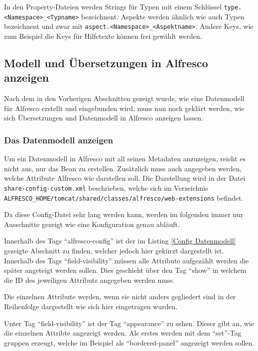 In den Property-Dateien werden Strings f\"ur Typen mit einem Schl\"ussel \texttt{type.<Namespace>\_<Typname>} bezeichnent. Aspekte werden \"ahnlich wie auch Typen bezeichnent und zwar mit \texttt{aspect.<Namespace>\_<Aspektname>}. Andere Keys, wie zum Beispiel die Keys f\"ur Hilfetexte k\"onnen frei gew\"ahlt werden.



\subsection{Modell und \"Ubersetzungen in Alfresco anzeigen}
Nach dem in den Vorherigen Abschnitten gezeigt wurde, wie eine Datenmodell f\"ur Alfresco erstellt und eingebunden wird, muss nun noch gekl\"art werden, wie sich \"Ubersetzungen und Datenmodell in Alfresco anzeigen lassen.

\subsubsection{Das Datenmodell anzeigen}\label{Das Datenmodell anzeigen}
Um ein Datenmodell in Alfresco mit all seinen Metadaten anzuzeigen, reicht es nicht aus, nur das Bean zu erstellen. Zus\"atzlich muss auch angegeben werden, welche Attribute Alfresco wie darstellen soll. Die Darstellung wird in der Datei \texttt{share-config-custom.xml} beschrieben, welche sich im Verzeichnis \texttt{ALFRESCO\_HOME/tomcat/shared/classes/alfresco/web-extensions} befindet.

Da diese Config-Datei sehr lang werden kann, werden im folgenden immer nur Ausschnitte gezeigt wie eine Konfiguration genau abl\"auft.

Innerhalb des Tags "`alfresco-config"' ist der im Listing \ref{Config Datenmodell} gezeigte Abschnitt zu finden, welcher jedoch hier gek\"urzt dargestellt ist. Innerhalb des Tags "`field-visibility"' m\"ussen alle Attribute aufgez\"ahlt werden die sp\"ater angeteigt werden sollen. Dies geschieht \"uber den Tag "`show"' in welchem die ID des jeweiligen Attributs angegeben werden muss. 

Die einzelnen Attribute werden, wenn sie nicht anders gegliedert sind in der Reihenfolge dargestellt wie sich hier eingetragen wurden.

Unter Tag "`field-visibility"' ist der Tag "`appearance"' zu sehen. Dieser gibt an, wie die einzelnen Attribte angezeigt werden. Als erstes werden mit dem "`set"'-Tag gruppen erzeugt, welche im Beispiel als "`bordered-panel"' angezeigt werden sollen.


